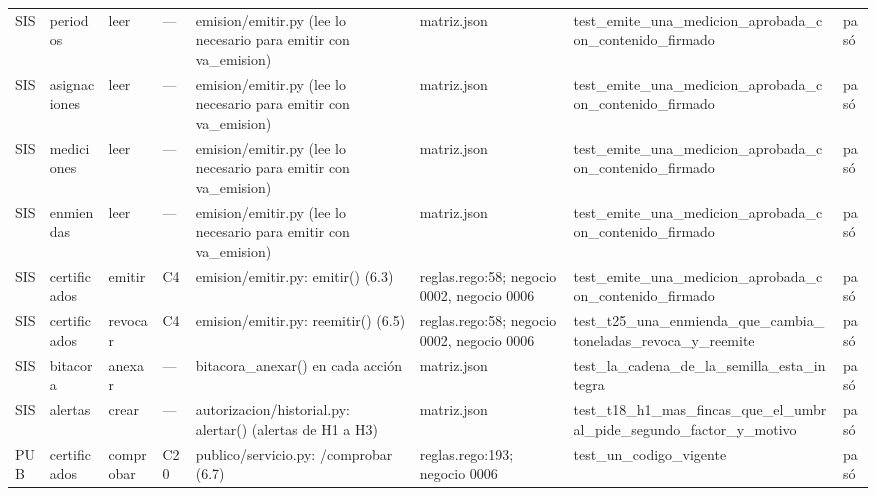 \documentclass[11pt,letterpaper]{article}
\begin{document}
\begin{center}
\begin{longtable}{@{}p{0.6cm} p{1.7cm} p{1.2cm} p{0.9cm} p{3.4cm} p{2.6cm} p{3.4cm} p{0.8cm}@{}}
SIS & periodos & leer & — & emision/emitir.py (lee lo necesario para emitir con va\_emision) & matriz.json & test\_\allowbreak{}emite\_\allowbreak{}una\_\allowbreak{}medicion\_\allowbreak{}aprobada\_\allowbreak{}con\_\allowbreak{}contenido\_\allowbreak{}firmado & pasó \\
SIS & asignaciones & leer & — & emision/emitir.py (lee lo necesario para emitir con va\_emision) & matriz.json & test\_\allowbreak{}emite\_\allowbreak{}una\_\allowbreak{}medicion\_\allowbreak{}aprobada\_\allowbreak{}con\_\allowbreak{}contenido\_\allowbreak{}firmado & pasó \\
SIS & mediciones & leer & — & emision/emitir.py (lee lo necesario para emitir con va\_emision) & matriz.json & test\_\allowbreak{}emite\_\allowbreak{}una\_\allowbreak{}medicion\_\allowbreak{}aprobada\_\allowbreak{}con\_\allowbreak{}contenido\_\allowbreak{}firmado & pasó \\
SIS & enmiendas & leer & — & emision/emitir.py (lee lo necesario para emitir con va\_emision) & matriz.json & test\_\allowbreak{}emite\_\allowbreak{}una\_\allowbreak{}medicion\_\allowbreak{}aprobada\_\allowbreak{}con\_\allowbreak{}contenido\_\allowbreak{}firmado & pasó \\
SIS & certificados & emitir & C4 & emision/emitir.py: emitir() (6.3) & reglas.rego:58; negocio 0002, negocio 0006 & test\_\allowbreak{}emite\_\allowbreak{}una\_\allowbreak{}medicion\_\allowbreak{}aprobada\_\allowbreak{}con\_\allowbreak{}contenido\_\allowbreak{}firmado & pasó \\
SIS & certificados & revocar & C4 & emision/emitir.py: reemitir() (6.5) & reglas.rego:58; negocio 0002, negocio 0006 & test\_\allowbreak{}t25\_\allowbreak{}una\_\allowbreak{}enmienda\_\allowbreak{}que\_\allowbreak{}cambia\_\allowbreak{}toneladas\_\allowbreak{}revoca\_\allowbreak{}y\_\allowbreak{}reemite & pasó \\
SIS & bitacora & anexar & — & bitacora\_anexar() en cada acción & matriz.json & test\_\allowbreak{}la\_\allowbreak{}cadena\_\allowbreak{}de\_\allowbreak{}la\_\allowbreak{}semilla\_\allowbreak{}esta\_\allowbreak{}integra & pasó \\
SIS & alertas & crear & — & autorizacion/historial.py: alertar() (alertas de H1 a H3) & matriz.json & test\_\allowbreak{}t18\_\allowbreak{}h1\_\allowbreak{}mas\_\allowbreak{}fincas\_\allowbreak{}que\_\allowbreak{}el\_\allowbreak{}umbral\_\allowbreak{}pide\_\allowbreak{}segundo\_\allowbreak{}factor\_\allowbreak{}y\_\allowbreak{}motivo & pasó \\
PUB & certificados & comprobar & C20 & publico/servicio.py: /comprobar (6.7) & reglas.rego:193; negocio 0006 & test\_\allowbreak{}un\_\allowbreak{}codigo\_\allowbreak{}vigente & pasó \\
\bottomrule
\end{longtable}
\end{center}
\end{document}
